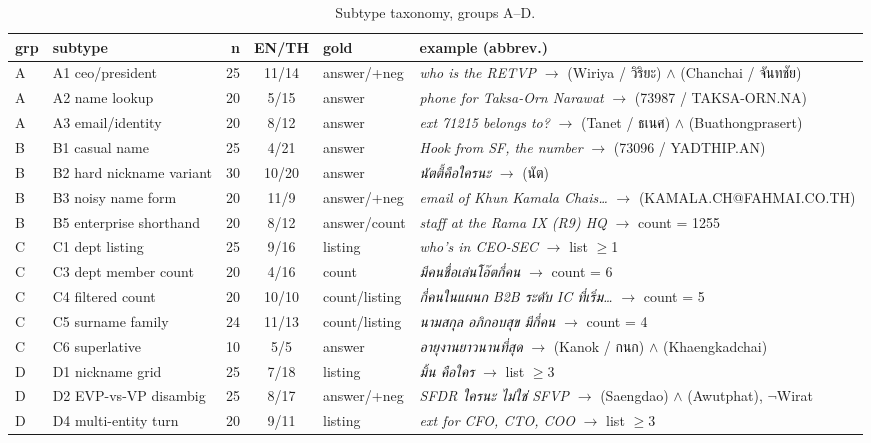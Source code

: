 \documentclass[11pt]{article}
\begin{document}
\begin{table}[t]
\centering
\footnotesize
\begin{tabular}{@{}llrclp{6.0cm}@{}}
\toprule
\textbf{grp} & \textbf{subtype} & \textbf{n} & \textbf{EN/TH} & \textbf{gold} & \textbf{example (abbrev.)} \\
\midrule
A & A1 ceo/president & 25 & 11/14 & answer/+neg & \emph{who is the RETVP} $\to$ (Wiriya / วิริยะ) $\wedge$ (Chanchai / จันทชัย) \\
A & A2 name lookup & 20 & 5/15 & answer & \emph{phone for Taksa-Orn Narawat} $\to$ (73987 / TAKSA-ORN.NA) \\
A & A3 email/identity & 20 & 8/12 & answer & \emph{ext 71215 belongs to?} $\to$ (Tanet / ธเนศ) $\wedge$ (Buathongprasert) \\
B & B1 casual name & 25 & 4/21 & answer & \emph{Hook from SF, the number} $\to$ (73096 / YADTHIP.AN) \\
B & B2 hard nickname variant & 30 & 10/20 & answer & \emph{นัตตี้คือใครนะ} $\to$ (นัต) \\
B & B3 noisy name form & 20 & 11/9 & answer/+neg & \emph{email of Khun Kamala Chais{\ldots}} $\to$ (KAMALA.CH@FAHMAI.CO.TH) \\
B & B5 enterprise shorthand & 20 & 8/12 & answer/count & \emph{staff at the Rama IX (R9) HQ} $\to$ count = 1255 \\
C & C1 dept listing & 25 & 9/16 & listing & \emph{who's in CEO-SEC} $\to$ list $\ge$1 \\
C & C3 dept member count & 20 & 4/16 & count & \emph{มีคนชื่อเล่นโอ๊ตกี่คน} $\to$ count = 6 \\
C & C4 filtered count & 20 & 10/10 & count/listing & \emph{กี่คนในแผนก B2B ระดับ IC ที่เริ่ม{\ldots}} $\to$ count = 5 \\
C & C5 surname family & 24 & 11/13 & count/listing & \emph{นามสกุล อภิกอบสุข มีกี่คน} $\to$ count = 4 \\
C & C6 superlative & 10 & 5/5 & answer & \emph{อายุงานยาวนานที่สุด} $\to$ (Kanok / กนก) $\wedge$ (Khaengkadchai) \\
D & D1 nickname grid & 25 & 7/18 & listing & \emph{มิ้น คือใคร} $\to$ list $\ge$3 \\
D & D2 EVP-vs-VP disambig & 25 & 8/17 & answer/+neg & \emph{SFDR ใครนะ ไม่ใช่ SFVP} $\to$ (Saengdao) $\wedge$ (Awutphat), $\neg$Wirat \\
D & D4 multi-entity turn & 20 & 9/11 & listing & \emph{ext for CFO, CTO, COO} $\to$ list $\ge$3 \\
\bottomrule
\end{tabular}
\caption{Subtype taxonomy, groups A--D.}
\label{tab:tax1}
\end{table}
\end{document}
